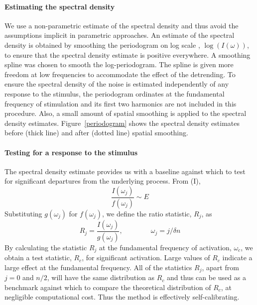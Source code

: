 \documentclass[a0,portrait]{a0poster}
\begin{document}
\begin{center}
{\paragraph{Estimating the spectral density}
We use a non-parametric estimate of the spectral density and thus avoid the assumptions implicit in parametric approaches. An estimate of the spectral density is obtained by smoothing the
periodogram on log scale \cite{wahba:1980}, $\log(I(\omega))$, to
ensure that the spectral density estimate is positive everywhere. A smoothing spline \cite{silverman:1985} was chosen to
smooth the log-periodogram. The spline is given more freedom at low frequencies to accommodate the effect of the detrending.
To ensure the spectral density of the noise is estimated independently
of any response to the stimulus, the periodogram ordinates at the
fundamental frequency of stimulation and its first two harmonics are
not included in this procedure. Also, a small amount of spatial smoothing is applied to the spectral density estimates. Figure~\ref{periodogram} shows the spectral density estimates before (thick line) and after (dotted line) spatial smoothing.  


\paragraph{Testing for a response to the stimulus}

The spectral density estimate provides us with a baseline against
which to test for significant departures from the underlying process.
From (I),
\begin{equation}
  \frac{I(\omega_j)}{f(\omega_j)} \sim E
\label{eq:13}
\end{equation}
Substituting $g(\omega_j)$ for $f(\omega_j)$, we define the ratio
statistic, $R_j$, as
\begin{equation}
  R_j = \frac{I(\omega_j)}{g(\omega_j)},\qquad\qquad \omega_j=j/\delta
  n
\label{eq:14}
\end{equation}
By calculating the statistic $R_j$ at the fundamental frequency of
activation, $\omega_c$, we obtain a test statistic, $R_c$, for
significant activation. Large values of $R_c$ indicate a large effect at the fundamental
frequency. All of the statistics $R_j$, apart from $j=0$ and $n/2$, will have the same distribution as $R_c$ and thus can be used as a benchmark against which to compare the theoretical distribution of $R_c$, at negligible computational cost. Thus the method is effectively self-calibrating.
}
\col{
}
\end{center}
\end{document}
